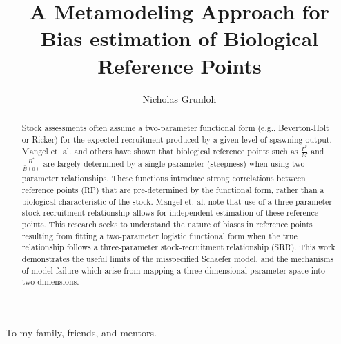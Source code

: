 \documentclass[12pt]{ucscthesis}
\title{A Metamodeling Approach for Bias estimation of Biological Reference Points}
\author{Nicholas Grunloh}
\begin{document}
%
\begin{frontmatter}

%
\maketitle
\copyrightpage
%
\tableofcontents
\listoffigures

%
\begin{abstract}
Stock assessments often assume a two-parameter functional form
(e.g., Beverton-Holt or Ricker) for the expected recruitment produced by a
given level of spawning output. Mangel et. al. \cite{mangel_perspective_2013} %
and others have shown that biological reference points such as $\frac{F^*}{M}$
and $\frac{B^*}{\bar{B}(0)}$ are largely determined by a single parameter
(steepness) when using two-parameter relationships. These functions introduce
strong correlations between reference points (RP) that are pre-determined by
the functional form, rather than a biological characteristic of the stock.
Mangel et. al. note that use of a three-parameter stock-recruitment
relationship allows for independent estimation of these reference points. This
research seeks to understand the nature of biases in reference points
resulting from fitting a two-parameter logistic functional form when the true
relationship follows a three-parameter stock-recruitment relationship (SRR). This  %
work demonstrates the useful limits of the misspecified Schaefer model, and
the mechanisms of model failure which arise from mapping a three-dimensional
parameter space into two dimensions.
\end{abstract}

%
\begin{dedication}
\null\vfil
{\large 
\begin{center}
To my family, friends, and mentors.
\end{center}}
\vfil\null
\end{dedication}

%
\begin{acknowledgements}


\end{acknowledgements}
\end{frontmatter}
\end{document}
